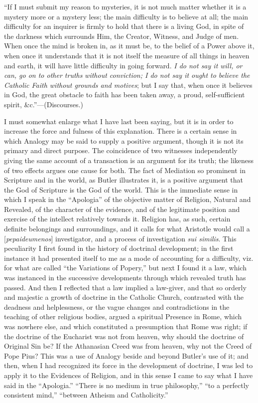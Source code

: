 ``If I must submit my reason to mysteries, it is not much
matter whether it is a mystery more or a mystery less; the main
difficulty is to believe at all; the main difficulty for an inquirer
is firmly to hold that there is a living God, in spite of the darkness
which surrounds Him, the Creator, Witness, and Judge of men. When once
the mind is broken in, as it must be, to the belief of a Power above
it, when once it understands that it is not itself the measure of all
things in heaven and earth, it will have little difficulty in going
forward. \emph{I do not say it will, or can, go on to other truths}
\emph{without conviction; I do not say it ought to believe the
Catholic Faith without grounds and motives}; but I say that, when
once it believes in God, the great obstacle to faith has been taken
away, a proud, self-sufficient spirit, \&c.''—(Discourses.)


I must somewhat enlarge what I have last been saying, but it is in
order to increase the force and fulness of this explanation. There is
a certain sense in which Analogy may be said to supply a positive
argument, though it is not its primary and direct purpose. The
coincidence of two witnesses independently giving the same account of
a transaction is an argument for its truth; the likeness of two
effects argues one cause for both. The fact of Mediation so prominent
in Scripture and in the world, as Butler illustrates it, is a positive
argument that the God of Scripture is the God of the world. This is
the immediate sense in which I speak in the ``Apologia'' of
the objective matter of Religion, Natural and Revealed, of the
character of the evidence, and of the legitimate position and exercise
of the intellect relatively towards it. Religion has, as such, certain
definite belongings and surroundings, and it calls for what Aristotle
would call a [\emph{pepaideumenos}] investigator, and a process of
investigation \emph{sui similis}. This peculiarity I first found in
the history of doctrinal development; in the first instance it had
presented itself to me as a mode of accounting for a difficulty, viz.
for what are called ``the Variations of Popery,'' but next I
found it a law, which was instanced in the successive developments
through which revealed truth has passed. And then I reflected that a
law implied a law-giver, and that so orderly and majestic a growth of
doctrine in the Catholic Church, contrasted with the deadness and
helplessness, or the vague changes and contradictions in the teaching
of other religious bodies, argued a spiritual Presence in Rome, which
was nowhere else, and which constituted a presumption that Rome was
right; if the doctrine of the Eucharist was not from heaven, why
should the doctrine of Original Sin be? If the Athanasian Creed was
from heaven, why not the Creed of Pope Pius? This was a use of Analogy
beside and beyond Butler's use of it; and then, when I had recognized
its force in the development of doctrine, I was led to apply it to the
Evidences of Religion, and in this sense I came to say what I have
said in the ``Apologia.'' ``There is no medium in true
philosophy,'' ``to a perfectly consistent mind,''
``between Atheism and Catholicity.''


